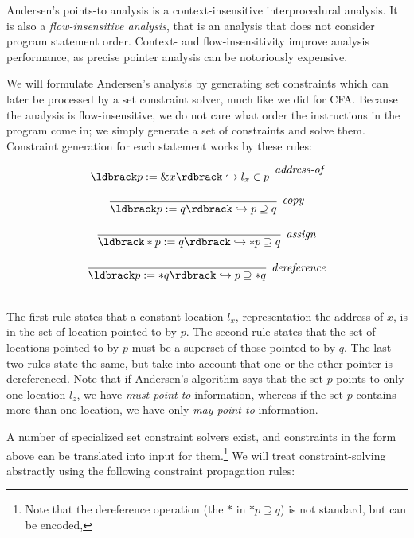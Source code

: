 \documentclass[11pt]{article}
\begin{document}
Andersen's points-to analysis is a context-insensitive interprocedural analysis.
It is also a \textit{flow-insensitive analysis}, that is an analysis that does
not consider program statement order. Context- and flow-insensitivity improve
analysis performance, as precise pointer analysis can be notoriously expensive.

We will formulate Andersen's analysis by generating set constraints which can
later be processed by a set constraint solver, much like we did for CFA. Because
the analysis is flow-insensitive, we do not care what order the instructions in
the program come in; we simply generate a set of constraints and solve them.
Constraint generation for each statement works by these rules: 

\[
\begin{array}{c}
\infer[\textit{address-of}]
	{\parg{p := \&x} \hookrightarrow l_x \in p}
	{}\\[3ex]
	
\infer[\textit{copy}]
	{\parg{p := q} \hookrightarrow p \supseteq q}
	{}\\[3ex]
	
\infer[\textit{assign}]
	{\parg{*p := q} \hookrightarrow *p \supseteq q}
	{}\\[3ex]
	
\infer[\textit{dereference}]
	{\parg{p := *q} \hookrightarrow p \supseteq *q}
	{}\\[3ex]
	
\end{array}
\]

The first rule states that a constant location $l_x$, representation the address
of $x$, is in the set of location pointed to by $p$. The second rule states that
the set of locations pointed to by $p$ must be a superset of those pointed to by
$q$. The last two rules state the same, but take into account that one or the
other pointer is dereferenced. Note that if Andersen's algorithm says that the
set $p$ points to only one location $l_z$, we have \emph{must-point-to}
information, whereas if the set $p$ contains more than one location, we have
only \emph{may-point-to} information.

A number of specialized set constraint solvers exist, and constraints in the
form above can be translated into input for them.\footnote{Note that the
  dereference operation (the $*$ in $*p \supseteq q$) is not standard, but can
  be encoded,} We will treat constraint-solving abstractly using the following
constraint propagation rules:
\end{document}
